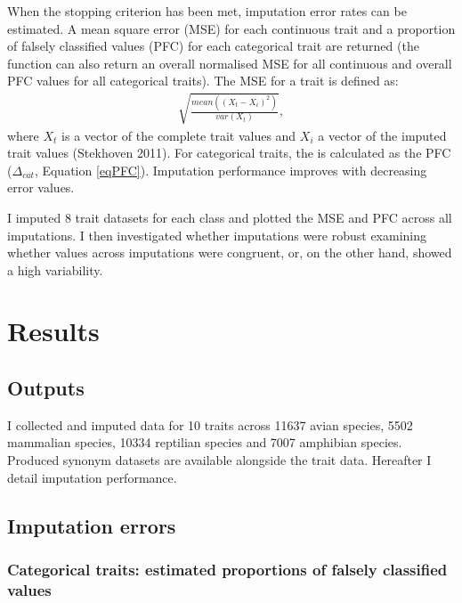 When the stopping criterion has been met, imputation error rates can be estimated. A mean square error (MSE) for each continuous trait and a proportion of falsely classified values (PFC) for each categorical trait are returned (the function can also return an overall normalised MSE for all continuous and overall PFC values for all categorical traits). The MSE for a trait is defined as:
\begin{align}
\sqrt{\frac{mean\left(\left(X_t-X_i\right)^2\right)}{var\left(X_t\right)}}, 
\end{align}
where $X_t$ is a vector of the complete trait values and $X_i$ a vector of the imputed trait values (Stekhoven 2011). For categorical traits, the  is calculated as the PFC ($\Delta_{cat}$, Equation \ref{eqPFC}). Imputation performance improves with decreasing error values.

I imputed 8 trait datasets for each class and plotted the MSE and PFC across all imputations. I then investigated whether imputations were robust examining whether values across imputations were congruent, or, on the other hand, showed a high variability.


\pagebreak
\section{Results}

\subsection{Outputs}
I collected and imputed data for 10 traits across 11637 avian species, 5502 mammalian species, 10334 reptilian species and 7007 amphibian species. Produced synonym datasets are available alongside the trait data. 
Hereafter I detail imputation performance. 

\subsection{Imputation errors}
\subsubsection{Categorical traits: estimated proportions of falsely classified values}

